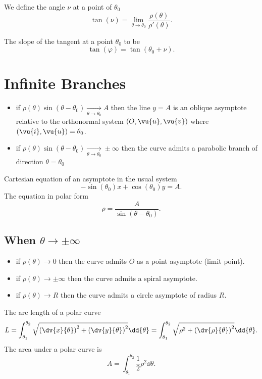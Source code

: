 We define the angle $\nu$ at a point of $\theta_0$
\[
	\tan(\nu) = \lim_{\theta \to \theta_0}\frac{\rho(\theta)}{\rho'(\theta)}
	.\]

The slope of the tangent at a point $\theta_0$ to be
\[
	\tan(\varphi) = \tan(\theta_0 + \nu)
	.\]

\section{Infinite Branches}
\begin{itemize}
	\item if $\rho(\theta)\sin(\theta-\theta_0)\underset{\theta\to\theta_0}{\longrightarrow}A$ then the line $y=A$ is an oblique asymptote relative to the orthonormal system $(O,\vu{u},\vu{v})$ where $(\vu{i},\vu{u}) = \theta_0$.
	\item if $\rho(\theta)\sin(\theta-\theta_0)\underset{\theta\to\theta_0}{\longrightarrow}\pm\infty$ then the curve admits a parabolic branch of direction $\theta=\theta_0$
\end{itemize}

Cartesian equation of an asymptote in the usual system
\[
	-\sin(\theta_0)x + \cos(\theta_0)y = A
	.\]
The equation in polar form
\[
	\rho = \frac{A}{\sin(\theta - \theta_0)}
	.\]

\subsection{When $\theta\to\pm\infty$}
\begin{itemize}
	\item if $\rho(\theta)\to 0$ then the curve admits $O$ as a point asymptote (limit point).
	\item if $\rho(\theta)\to \pm\infty$ then the curve admits a spiral asymptote.
	\item if $\rho(\theta)\to R$ then the curve admits a circle asymptote of radius $R$.
\end{itemize}

\begin{remark}
	The arc length of a polar curve
	\[
		L = \int_{\theta_1}^{\theta_2}\sqrt{\left(\dv{x}{\theta}\right)^2 + \left(\dv{y}{\theta}\right)^2 }\dd{\theta} = \int_{\theta_1}^{\theta_2}\sqrt{\rho^2 + \left(\dv{\rho}{\theta}\right)^2} \dd{\theta}
		.\]
	The area under a polar curve is
	\[
		A = \int_{\theta_1}^{\theta_2} \frac{1}{2}\rho^2 \dd{\theta}
		.\]
\end{remark}
